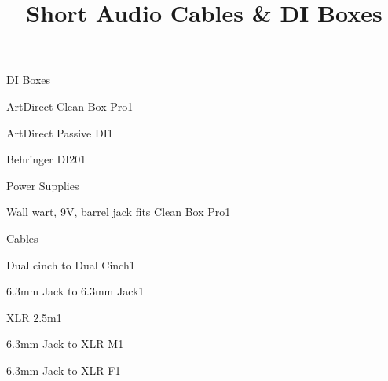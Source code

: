 \def\papersize{5}




\title{Short Audio Cables \& DI Boxes}

\begin{checklist}{DI Boxes}
  \item{ArtDirect Clean Box Pro}{1}
  \item{ArtDirect Passive DI}{1}
  \item{Behringer DI20}{1}
\end{checklist}

\begin{checklist}{Power Supplies}
  \item{Wall wart, 9V, barrel jack fits Clean Box Pro}{1}
\end{checklist}

\begin{checklist}{Cables}
  \item{Dual cinch to Dual Cinch}{1}
  \item{6.3mm Jack to 6.3mm Jack}{1}
  \item{XLR 2.5m}{1}
  \item{6.3mm Jack to XLR M}{1}
  \item{6.3mm Jack to XLR F}{1}
\end{checklist}


